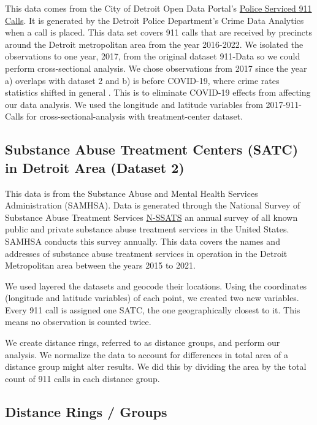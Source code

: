\documentclass[12pt]{article}
\begin{document}
This data comes from the City of Detroit Open Data Portal's   \href{https://data.detroitmi.gov/datasets/detroitmi::police-serviced-911-calls/about}{Police Serviced 911 Calls}. It is generated by the Detroit Police Department's Crime Data Analytics when a call is placed. This data set covers 911 calls that are received by precincts around the Detroit metropolitan area from the year 2016-2022. We isolated the observations to one year, 2017, from the original dataset 911-Data so we could perform cross-sectional analysis. We chose observations from 2017 since the year a) overlaps with dataset 2 and b) is before COVID-19, where crime rates statistics shifted in general \cite{covid_and_crime}. This is to eliminate COVID-19 effects from affecting our data analysis. We used the longitude and latitude variables from 2017-911-Calls for cross-sectional-analysis with treatment-center dataset.

\subsection{Substance Abuse Treatment Centers (SATC) in Detroit Area (Dataset 2)}

This data is from the Substance Abuse and Mental Health Services Administration (SAMHSA). Data is generated through the National Survey of Substance Abuse Treatment Services \href{https://www.samhsa.gov/data/data-we-collect/n-ssats-national-survey-substance-abuse-treatment-services}{N-SSATS} an annual survey of all known public and private substance abuse treatment services in the United States. SAMHSA conducts this survey annually. This data covers the names and addresses of substance abuse treatment services in operation in the Detroit Metropolitan area between the years 2015 to 2021. 

 
We used layered the datasets and geocode their locations. Using the coordinates (longitude and latitude variables) of each point, we created two new variables. Every 911 call is assigned one SATC, the one geographically closest to it. This means no observation is counted twice. 

We create distance rings, referred to as distance groups, and perform our analysis. We normalize the data to account for differences in total area of a distance group might alter results. We did this by dividing the area by the total count of 911 calls in each distance group.

\subsection{Distance Rings / Groups}
\end{document}
